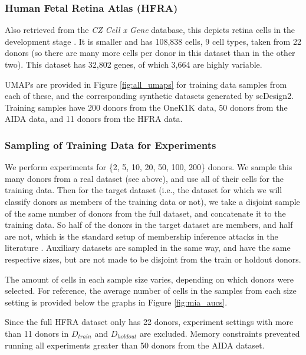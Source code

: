 \documentclass[unnumsec,webpdf,contemporary,large]{oup-authoring-template}%
\theoremstyle{thmstyleone}%
\theoremstyle{thmstyletwo}%
\theoremstyle{thmstylethree}%
\begin{document}
\subsubsection{Human Fetal Retina Atlas (HFRA)} Also retrieved from the \textit{CZ Cell x Gene} database, this depicts retina cells in the development stage \cite{kriukov2025unraveling}. 
It is smaller and has 108,838 cells, 9 cell types, taken from 22 donors (so there are many more cells per donor in this dataset than in the other two). This dataset has 32,802 genes, of which 3,664 are highly variable.

UMAPs are provided in Figure \ref{fig:all_umaps} for training data samples from each of these, and the corresponding synthetic datasets generated by scDesign2. Training samples have 200 donors from the OneK1K data, 50 donors from the AIDA data, and 11 donors from the HFRA data.


\subsubsection{Sampling of Training Data for Experiments}
We perform experiments for 
\{2, 5, 10, 20, 50, 100, 200\} donors. 
We sample this many donors from a real dataset (see above), and use all of their cells for the training data. Then for the target dataset (i.e., the dataset for which we will classify donors as members of the training data or not), we take a disjoint sample of the same number of donors from the full dataset, and concatenate it to the training data. So half of the donors in the target dataset are members, and half are not, which is the standard setup of membership inference attacks in the literature \cite{allard2023snake, houssiau2022tapas, meeus2023achilles, wu2025winning}. Auxiliary datasets are sampled in the same way, and have the same respective sizes, but are not made to be disjoint from the train or holdout donors. 

The amount of cells in each sample size varies, depending on which donors were selected. For reference, the average number of cells in the samples from each size setting is provided below the graphs in Figure \ref{fig:mia_aucs}. 

Since the full HFRA dataset only has 22 donors, experiment settings with more than 11 donors in $D_{train}$ and $D_{holdout}$ are excluded. Memory constraints prevented running all experiments greater than 50 donors from the AIDA dataset.
\end{document}
